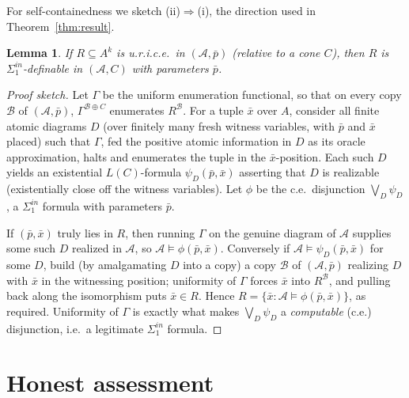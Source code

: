 \documentclass{article}
\newcommand{\A}{\mathcal{A}}
\newcommand{\B}{\mathcal{B}}
\newcommand{\Sin}{\Sigma^{in}_1}
\newcommand{\barx}{\bar x}
\theoremstyle{plain}
\newtheorem{lemma}{Lemma}
\theoremstyle{definition}
\begin{document}
For self-containedness we sketch (ii)$\Rightarrow$(i), the direction used in
Theorem~\ref{thm:result}.

\begin{lemma}\label{lem:sketch}
If $R\subseteq A^k$ is u.r.i.c.e.\ in $(\A,\bar p)$ (relative to a cone $C$), then $R$
is $\Sin$-definable in $(\A,C)$ with parameters $\bar p$.
\end{lemma}

\begin{proof}[Proof sketch]
Let $\Gamma$ be the uniform enumeration functional, so that on every copy $\B$ of
$(\A,\bar p)$, $\Gamma^{\B\oplus C}$ enumerates $R^\B$. For a tuple $\barx$ over $A$,
consider all finite atomic diagrams $D$ (over finitely many fresh witness variables,
with $\bar p$ and $\barx$ placed) such that $\Gamma$, fed the positive atomic
information in $D$ as its oracle approximation, halts and enumerates the tuple in the
$\barx$-position. Each such $D$ yields an existential $L(C)$-formula
$\psi_D(\bar p,\barx)$ asserting that $D$ is realizable (existentially close off the
witness variables). Let $\phi$ be the c.e.\ disjunction $\bigvee_D\psi_D$, a $\Sin$
formula with parameters $\bar p$.

If $(\bar p,\barx)$ truly lies in $R$, then running $\Gamma$ on the genuine diagram of
$\A$ supplies some such $D$ realized in $\A$, so $\A\models\phi(\bar p,\barx)$.
Conversely if $\A\models\psi_D(\bar p,\barx)$ for some $D$, build (by amalgamating $D$
into a copy) a copy $\B$ of $(\A,\bar p)$ realizing $D$ with $\barx$ in the witnessing
position; uniformity of $\Gamma$ forces $\barx$ into $R^\B$, and pulling back along the
isomorphism puts $\barx\in R$. Hence $R=\{\barx:\A\models\phi(\bar p,\barx)\}$, as
required. Uniformity of $\Gamma$ is exactly what makes $\bigvee_D\psi_D$ a
\emph{computable} (c.e.) disjunction, i.e.\ a legitimate $\Sin$ formula.
\end{proof}

\section{Honest assessment}
\end{document}
